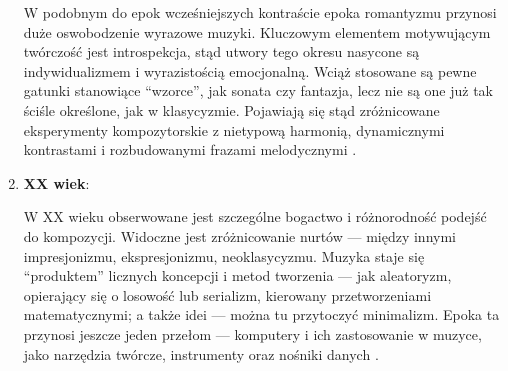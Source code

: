 \begin{enumerate}
	      W podobnym do epok wcześniejszych kontraście epoka romantyzmu przynosi duże oswobodzenie wyrazowe muzyki.
	      Kluczowym elementem motywującym twórczość jest introspekcja, stąd utwory tego okresu nasycone są indywidualizmem
	      i wyrazistością emocjonalną.
	      Wciąż stosowane są pewne gatunki stanowiące \enquote{wzorce}, jak sonata czy fantazja,
	      lecz nie są one już tak ściśle określone, jak w klasycyzmie.
	      Pojawiają się stąd zróżnicowane eksperymenty kompozytorskie z nietypową harmonią, dynamicznymi kontrastami i
	      rozbudowanymi frazami melodycznymi \cite{estetyka}.
	\item \textbf{XX wiek}:

	      W XX wieku obserwowane jest szczególne bogactwo i różnorodność podejść do kompozycji.
	      Widoczne jest zróżnicowanie nurtów — między innymi impresjonizmu, ekspresjonizmu, neoklasycyzmu.
	      Muzyka staje się \enquote{produktem} licznych koncepcji i metod tworzenia — jak aleatoryzm, opierający
	      się o losowość lub serializm, kierowany przetworzeniami matematycznymi; a także idei — można tu przytoczyć minimalizm.
	      Epoka ta przynosi jeszcze jeden przełom — komputery i ich zastosowanie w muzyce,
	      jako narzędzia twórcze, instrumenty oraz nośniki danych \cite{atlas2}.
\end{enumerate}

